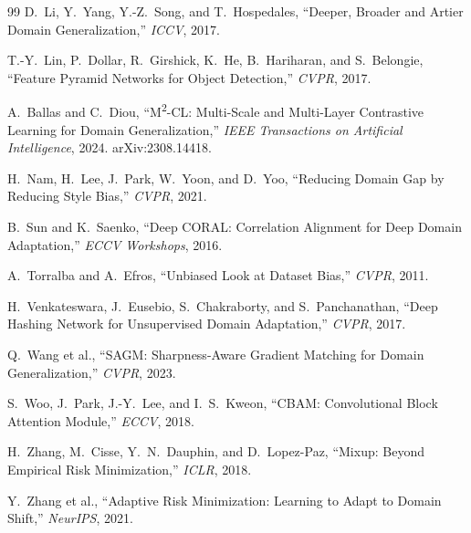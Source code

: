 \documentclass[12pt,a4paper]{article}
\begin{document}
\begin{thebibliography}{99}
D.~Li, Y.~Yang, Y.-Z.~Song, and T.~Hospedales,
``Deeper, Broader and Artier Domain Generalization,''
\emph{ICCV}, 2017.

T.-Y.~Lin, P.~Dollar, R.~Girshick, K.~He, B.~Hariharan, and S.~Belongie,
``Feature Pyramid Networks for Object Detection,''
\emph{CVPR}, 2017.

A.~Ballas and C.~Diou,
``M\textsuperscript{2}-CL: Multi-Scale and Multi-Layer Contrastive Learning for Domain Generalization,''
\emph{IEEE Transactions on Artificial Intelligence}, 2024. arXiv:2308.14418.

H.~Nam, H.~Lee, J.~Park, W.~Yoon, and D.~Yoo,
``Reducing Domain Gap by Reducing Style Bias,''
\emph{CVPR}, 2021.

B.~Sun and K.~Saenko,
``Deep CORAL: Correlation Alignment for Deep Domain Adaptation,''
\emph{ECCV Workshops}, 2016.

A.~Torralba and A.~Efros,
``Unbiased Look at Dataset Bias,''
\emph{CVPR}, 2011.

H.~Venkateswara, J.~Eusebio, S.~Chakraborty, and S.~Panchanathan,
``Deep Hashing Network for Unsupervised Domain Adaptation,''
\emph{CVPR}, 2017.

Q.~Wang et al.,
``SAGM: Sharpness-Aware Gradient Matching for Domain Generalization,''
\emph{CVPR}, 2023.

S.~Woo, J.~Park, J.-Y.~Lee, and I.~S.~Kweon,
``CBAM: Convolutional Block Attention Module,''
\emph{ECCV}, 2018.

H.~Zhang, M.~Cisse, Y.~N.~Dauphin, and D.~Lopez-Paz,
``Mixup: Beyond Empirical Risk Minimization,''
\emph{ICLR}, 2018.

Y.~Zhang et al.,
``Adaptive Risk Minimization: Learning to Adapt to Domain Shift,''
\emph{NeurIPS}, 2021.

\end{thebibliography}
\end{document}
